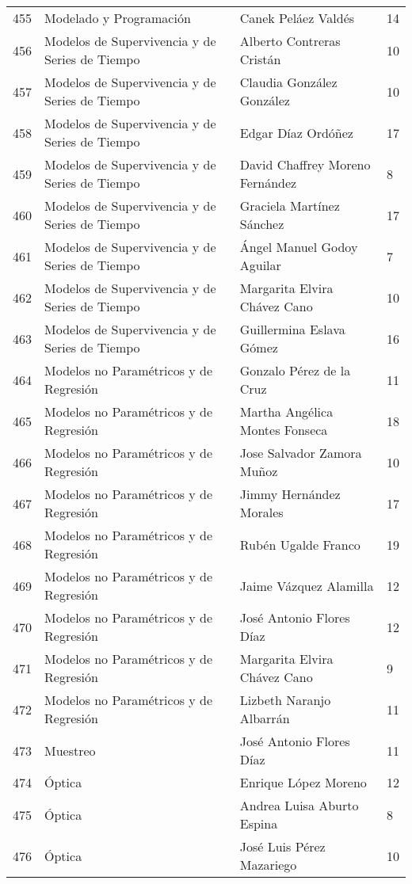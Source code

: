 \begin{table}[ht]
\begin{tabular}{rlll}
  455 & Modelado y Programación & Canek Peláez Valdés & 14 \\ 
  456 & Modelos de Supervivencia y de Series de Tiempo & Alberto Contreras Cristán & 10 \\ 
  457 & Modelos de Supervivencia y de Series de Tiempo & Claudia González González & 10 \\ 
  458 & Modelos de Supervivencia y de Series de Tiempo & Edgar Díaz Ordóñez & 17 \\ 
  459 & Modelos de Supervivencia y de Series de Tiempo & David Chaffrey Moreno Fernández & 8 \\ 
  460 & Modelos de Supervivencia y de Series de Tiempo & Graciela Martínez Sánchez & 17 \\ 
  461 & Modelos de Supervivencia y de Series de Tiempo & Ángel Manuel Godoy Aguilar & 7 \\ 
  462 & Modelos de Supervivencia y de Series de Tiempo & Margarita Elvira Chávez Cano & 10 \\ 
  463 & Modelos de Supervivencia y de Series de Tiempo & Guillermina Eslava Gómez & 16 \\ 
  464 & Modelos no Paramétricos y de Regresión & Gonzalo Pérez de la Cruz & 11 \\ 
  465 & Modelos no Paramétricos y de Regresión & Martha Angélica Montes Fonseca & 18 \\ 
  466 & Modelos no Paramétricos y de Regresión & Jose Salvador Zamora Muñoz & 10 \\ 
  467 & Modelos no Paramétricos y de Regresión & Jimmy Hernández Morales & 17 \\ 
  468 & Modelos no Paramétricos y de Regresión & Rubén Ugalde Franco & 19 \\ 
  469 & Modelos no Paramétricos y de Regresión & Jaime Vázquez Alamilla & 12 \\ 
  470 & Modelos no Paramétricos y de Regresión & José Antonio Flores Díaz & 12 \\ 
  471 & Modelos no Paramétricos y de Regresión & Margarita Elvira Chávez Cano & 9 \\ 
  472 & Modelos no Paramétricos y de Regresión & Lizbeth Naranjo Albarrán & 11 \\ 
  473 & Muestreo & José Antonio Flores Díaz & 11 \\ 
  474 & Óptica & Enrique López Moreno & 12 \\ 
  475 & Óptica & Andrea Luisa Aburto Espina & 8 \\ 
  476 & Óptica & José Luis Pérez Mazariego & 10 \\ 

\end{tabular}
\end{table}
